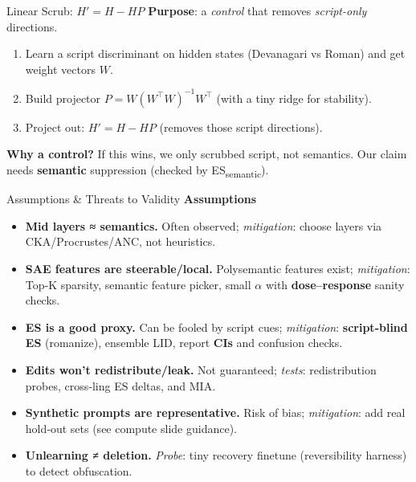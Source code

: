 \documentclass[aspectratio=169]{beamer}
\begin{document}
\begin{frame}{Linear Scrub: $H' = H - H P$}
\small
\textbf{Purpose}: a \emph{control} that removes \emph{script-only} directions.
\begin{enumerate}
  \item Learn a script discriminant on hidden states (Devanagari vs Roman) and get weight vectors $W$.
  \item Build projector $P = W (W^\top W)^{-1} W^\top$ (with a tiny ridge for stability).
  \item Project out: $H' = H - H P$ (removes those script directions).
\end{enumerate}
\textbf{Why a control?} If this wins, we only scrubbed script, not semantics. Our claim needs \textbf{semantic} suppression (checked by ES\textsubscript{semantic}).
\end{frame}

\begin{frame}{Assumptions \& Threats to Validity}
\small
\textbf{Assumptions}
\begin{itemize}
  \item \textbf{Mid layers ≈ semantics.} Often observed; \emph{mitigation}:
        choose layers via CKA/Procrustes/ANC, not heuristics.
  \item \textbf{SAE features are steerable/local.} Polysemantic features exist;
        \emph{mitigation}: Top‑K sparsity, semantic feature picker, small
        $\alpha$ with \textbf{dose–response} sanity checks.
  \item \textbf{ES is a good proxy.} Can be fooled by script cues;
        \emph{mitigation}: \textbf{script‑blind ES} (romanize), ensemble LID,
        report \textbf{CIs} and confusion checks.
  \item \textbf{Edits won’t redistribute/leak.} Not guaranteed; \emph{tests}:
        redistribution probes, cross‑ling ES deltas, and MIA.
  \item \textbf{Synthetic prompts are representative.} Risk of bias;
        \emph{mitigation}: add real hold‑out sets (see compute slide guidance).
  \item \textbf{Unlearning ≠ deletion.} \emph{Probe}: tiny recovery finetune
        (reversibility harness) to detect obfuscation.
\end{itemize}
\end{frame}
\end{document}
